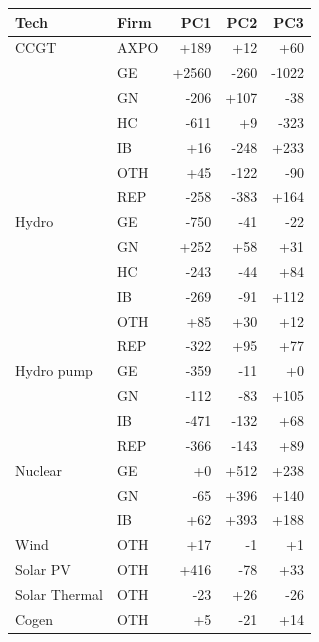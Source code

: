 \begin{tabular}{l l r r r}
\toprule
Tech & Firm & PC1 & PC2 & PC3 \\
\midrule
CCGT & AXPO & +189 & +12 & +60 \\
 & GE & +2560 & -260 & -1022 \\
 & GN & -206 & +107 & -38 \\
 & HC & -611 & +9 & -323 \\
 & IB & +16 & -248 & +233 \\
 & OTH & +45 & -122 & -90 \\
 & REP & -258 & -383 & +164 \\
\addlinespace
Hydro & GE & -750 & -41 & -22 \\
 & GN & +252 & +58 & +31 \\
 & HC & -243 & -44 & +84 \\
 & IB & -269 & -91 & +112 \\
 & OTH & +85 & +30 & +12 \\
 & REP & -322 & +95 & +77 \\
\addlinespace
Hydro pump & GE & -359 & -11 & +0 \\
 & GN & -112 & -83 & +105 \\
 & IB & -471 & -132 & +68 \\
 & REP & -366 & -143 & +89 \\
\addlinespace
Nuclear & GE & +0 & +512 & +238 \\
 & GN & -65 & +396 & +140 \\
 & IB & +62 & +393 & +188 \\
\addlinespace
Wind & OTH & +17 & -1 & +1 \\
\addlinespace
Solar PV & OTH & +416 & -78 & +33 \\
\addlinespace
Solar Thermal & OTH & -23 & +26 & -26 \\
\addlinespace
Cogen & OTH & +5 & -21 & +14 \\
\bottomrule
\end{tabular}